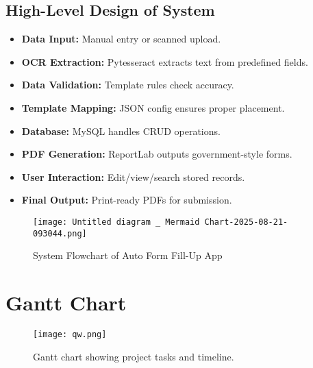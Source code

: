 \documentclass[12pt,a4paper]{report}
\begin{document}
\section{High-Level Design of System}
\begin{itemize}
    \item \textbf{Data Input:} Manual entry or scanned upload.
    \item \textbf{OCR Extraction:} Pytesseract extracts text from predefined fields.
    \item \textbf{Data Validation:} Template rules check accuracy.
    \item \textbf{Template Mapping:} JSON config ensures proper placement.
    \item \textbf{Database:} MySQL handles CRUD operations.
    \item \textbf{PDF Generation:} ReportLab outputs government-style forms.
    \item \textbf{User Interaction:} Edit/view/search stored records.
    \item \textbf{Final Output:} Print-ready PDFs for submission.
\end{itemize}

\begin{figure}[H]
    \centering
    \texttt{[image: Untitled diagram \_ Mermaid Chart-2025-08-21-093044.png]}
    \caption{System Flowchart of Auto Form Fill-Up App}
\end{figure}

\chapter{Gantt Chart}
\begin{figure}[H]
    \centering
    \texttt{[image: qw.png]}
    \caption{Gantt chart showing project tasks and timeline.}
\end{figure}
\end{document}
